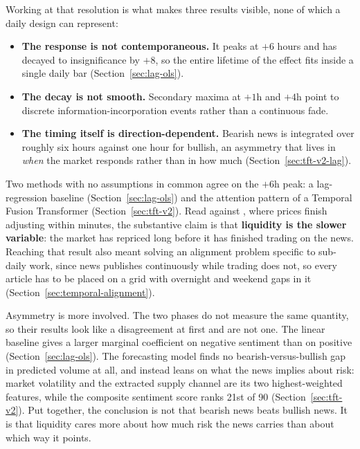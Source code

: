 Working at that resolution is what makes three results visible, none of which a daily design can represent:

\begin{itemize}
  \item \textbf{The response is not contemporaneous.} It peaks at $+6$ hours and has decayed to insignificance by $+8$, so the entire lifetime of the effect fits inside a single daily bar (Section~\ref{sec:lag-ols}).
  \item \textbf{The decay is not smooth.} Secondary maxima at $+1$h and $+4$h point to discrete information-incorporation events rather than a continuous fade.
  \item \textbf{The timing itself is direction-dependent.} Bearish news is integrated over roughly six hours against one hour for bullish, an asymmetry that lives in \emph{when} the market responds rather than in how much (Section~\ref{sec:tft-v2-lag}).
\end{itemize}

Two methods with no assumptions in common agree on the $+6$h peak: a lag-regression baseline (Section~\ref{sec:lag-ols}) and the attention pattern of a Temporal Fusion Transformer (Section~\ref{sec:tft-v2}). Read against \citet{ederington1993}, where prices finish adjusting within minutes, the substantive claim is that \textbf{liquidity is the slower variable}: the market has repriced long before it has finished trading on the news. Reaching that result also meant solving an alignment problem specific to sub-daily work, since news publishes continuously while trading does not, so every article has to be placed on a grid with overnight and weekend gaps in it (Section~\ref{sec:temporal-alignment}).

Asymmetry is more involved. The two phases do not measure the same quantity, so their results look like a disagreement at first and are not one. The linear baseline gives a larger marginal coefficient on negative sentiment than on positive (Section~\ref{sec:lag-ols}). The forecasting model finds no bearish-versus-bullish gap in predicted volume at all, and instead leans on what the news implies about risk: market volatility and the extracted supply channel are its two highest-weighted features, while the composite sentiment score ranks 21st of 90 (Section~\ref{sec:tft-v2}). Put together, the conclusion is not that bearish news beats bullish news. It is that liquidity cares more about how much risk the news carries than about which way it points.


